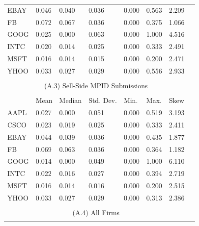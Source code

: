 \documentclass{article}
\begin{document}
\begin{table}[htp!]
\begin{center}
{\begin{tabular}{lp{1.5cm}p{1.5cm}p{1.5cm}p{1.5cm}p{1.5cm}p{1.5cm}p{1.5cm}}
EBAY                                                  & 0.046 & 0.040  & 0.036     & 0.000 & 0.563 & 2.209 \\
FB                                                    & 0.072 & 0.067  & 0.036     & 0.000 & 0.375 & 1.066 \\
GOOG                                                  & 0.025 & 0.000  & 0.063     & 0.000 & 1.000 & 4.516 \\
INTC                                                  & 0.020 & 0.014  & 0.025     & 0.000 & 0.333 & 2.491 \\
MSFT                                                  & 0.016 & 0.014  & 0.015     & 0.000 & 0.200 & 2.471 \\
YHOO                                                  & 0.033 & 0.027  & 0.029     & 0.000 & 0.556 & 2.933 \\ \\
\multicolumn{7}{c}{(A.3) Sell-Side MPID Submissions}       \\ \\
                                                      & Mean  & Median & Std. Dev. & Min.  & Max.  & Skew  \\
AAPL                                                  & 0.027 & 0.000  & 0.051     & 0.000 & 0.519 & 3.193 \\
CSCO                                                  & 0.023 & 0.019  & 0.025     & 0.000 & 0.333 & 2.411 \\
EBAY                                                  & 0.044 & 0.039  & 0.036     & 0.000 & 0.435 & 1.877 \\
FB                                                    & 0.069 & 0.063  & 0.036     & 0.000 & 0.364 & 1.182 \\
GOOG                                                  & 0.014 & 0.000  & 0.049     & 0.000 & 1.000 & 6.110 \\
INTC                                                  & 0.022 & 0.016  & 0.027     & 0.000 & 0.394 & 2.719 \\
MSFT                                                  & 0.016 & 0.014  & 0.016     & 0.000 & 0.200 & 2.515 \\
YHOO                                                  & 0.033 & 0.027  & 0.029     & 0.000 & 0.313 & 2.386 \\ \\
\multicolumn{7}{c}{(A.4) All Firms}                      \\ \\

\end{tabular}}
\end{center}
\end{table}
\end{document}
